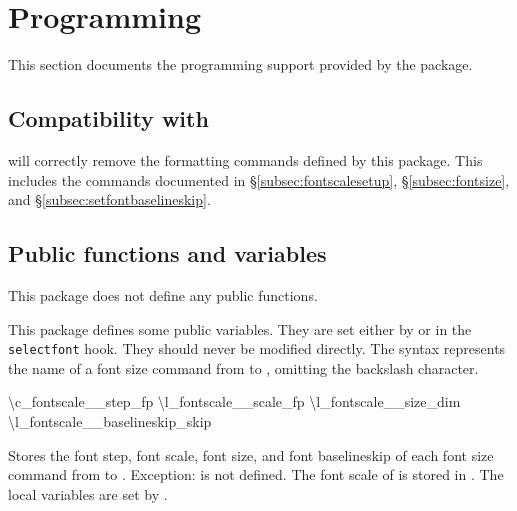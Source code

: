 \documentclass{beery}
\begin{document}
\section{Programming}
\label{sec:programming}

This section documents the  programming support provided by the  package.

\subsection
  {%
    Compatibility with
    \texorpdfstring
      {}
      {\textbackslash{}text\_purify:n}%
  }
\label{subsec:textpurify}

 will correctly remove the formatting commands defined by this package.
This includes the commands documented in \S\ref{subsec:fontscalesetup}, \S\ref{subsec:fontsize}, and \S\ref{subsec:setfontbaselineskip}.

\subsection{Public functions and variables}
\label{subsec:publicexpl3}

This package does not define any public  functions.

This package defines some public  variables.
They are set either by  or in the \texttt{selectfont} hook.
They should never be modified directly.
The syntax  represents the name of a font size command from  to , omitting the backslash character.

\begin{mydisplaycode}
  \ttfamily
  \textbackslash{}c\_fontscale\_\_step\_fp
  \nopagebreak\newline
  \textbackslash{}l\_fontscale\_\_scale\_fp
  \newline
  \textbackslash{}l\_fontscale\_\_size\_dim
  \nopagebreak\newline
  \textbackslash{}l\_fontscale\_\_baselineskip\_skip
\end{mydisplaycode}

Stores the font step, font scale, font size, and font baselineskip of each font size command from  to .
Exception:
 is not defined.
The font scale of  is stored in .
The local variables are set by .
\end{document}
